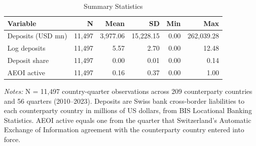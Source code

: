 \begin{table}[H]
\centering
\caption{Summary Statistics}
\label{tab:summary}
\begin{threeparttable}
\begin{tabular}{lrrrrr}
\toprule
Variable & N & Mean & SD & Min & Max \\
\midrule
Deposits (USD mn) & 11,497 & 3,977.06 & 15,228.15 & 0.00 & 262,039.28 \\
Log deposits & 11,497 & 5.57 & 2.70 & 0.00 & 12.48 \\
Deposit share & 11,497 & 0.00 & 0.01 & 0.00 & 0.14 \\
AEOI active & 11,497 & 0.16 & 0.37 & 0.00 & 1.00 \\
\bottomrule
\end{tabular}
\begin{tablenotes}[flushleft]
\small
\item \textit{Notes:} N = 11,497 country-quarter observations across 209 counterparty countries and 56 quarters (2010--2023). Deposits are Swiss bank cross-border liabilities to each counterparty country in millions of US dollars, from BIS Locational Banking Statistics. AEOI active equals one from the quarter that Switzerland's Automatic Exchange of Information agreement with the counterparty country entered into force.
\end{tablenotes}
\end{threeparttable}
\end{table}

